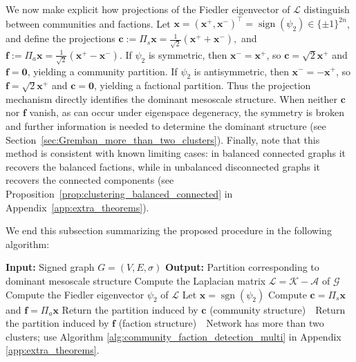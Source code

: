 \documentclass[reprint,onecolumn]{article}
\newcommand{\mc}[1]{\mathcal{#1}}
\newcommand{\1}{\mathbb{1}}
\newcommand{\0}{\mathbf{0}}
\begin{document}
We now make explicit how projections of the Fiedler eigenvector of 
$\mc L$ distinguish between communities and factions. Let
$\mathbf{x}=(\mathbf{x^+},\mathbf{x^-})^\top=\operatorname{sign}(\psi_2)\in\{\pm1\}^{2n}$, and define the 
projections
\(
\mathbf{c}:=\Pi_s \mathbf{x}=\tfrac{1}{\sqrt{2}}(\mathbf{x}^++\mathbf{x}^-),\) and \(\mathbf{f}:=\Pi_a \mathbf{x}=\tfrac{1}{\sqrt{2}}(\mathbf{x}^+-\mathbf{x}^-).
\)
If $\psi_2$ is symmetric, then $\mathbf{x}^-=\mathbf{x}^+$, so $\mathbf{c}=\sqrt{2}\mathbf{x}^+$ and 
$\mathbf{f}=\mathbf{0}$, yielding a community partition. If $\psi_2$ is antisymmetric, 
then $\mathbf{x}^-=-\mathbf{x}^+$, so $\mathbf{f}=\sqrt{2}\mathbf{x}^+$ and $\mathbf{c}=\mathbf{0}$, yielding a factional 
partition. Thus the projection mechanism directly identifies the 
dominant mesoscale structure. When neither $\mathbf{c}$ nor $\mathbf{f}$ vanish, as can occur under eigenspace degeneracy, the symmetry is broken and 
further information is needed to determine the dominant structure (see 
Section~\ref{sec:Gremban_more_than_two_clusters}). Finally, note that this method is consistent with known limiting cases: in balanced connected graphs it recovers the balanced factions, while in unbalanced disconnected graphs it recovers the connected components (see Proposition~\ref{prop:clustering_balanced_connected} in Appendix~\ref{app:extra_theorems}).

We end this subsection summarizing the proposed procedure in the following algorithm:

\begin{algorithm}[H]
\caption{Detecting communities and factions via the Gremban Laplacian}
\label{alg:community_faction_detection}
\begin{algorithmic}[1]
\State \textbf{Input:} Signed graph \( G = (V,E,\sigma) \)
\State \textbf{Output:} Partition corresponding to dominant mesoscale structure
\State Compute the Laplacian matrix \( \mc L = \mc K - \mc A \) of $\mathcal{G}$ 
\State Compute the Fiedler eigenvector \( \psi_2 \) of \( \mc L \)
\State Let \( \mathbf{x} = \operatorname{sgn}(\psi_2) \)
\State Compute \( \mathbf{c} = \Pi_s \mathbf{x} \) and \( \mathbf{f} = \Pi_a \mathbf{x} \)
    \State Return the partition induced by \( \mathbf{c} \) (community structure) \,\,\quad\quad{}
    \State Return the partition induced by \( \mathbf{f} \) (faction structure) \,\,\quad\quad\quad\quad{}
\Else
    \State Network has more than two clusters; use Algorithm \ref{alg:community_faction_detection_multi} in Appendix \ref{app:extra_theorems}.
\EndIf
\end{algorithmic}
\end{algorithm}
%
\end{document}
